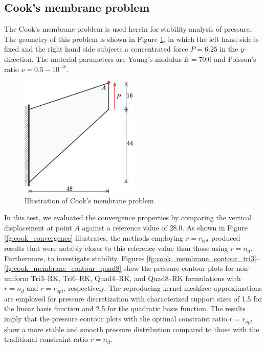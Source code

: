 \subsection{Cook's membrane problem}

The Cook's membrane problem \cite{simo1990} is used herein for stability analysis of pressure. The geometry of this problem is shown in Figure \ref{fg:cook_illsutration}, in which the left hand side is fixed and the right hand side subjects a concentrated force $P=6.25$ in the $y$-direction. The material parameters are Young's modulus $E=70.0$ and Poisson's ratio $\nu=0.5-10^{-8}$.

\begin{figure}[H]
\centering
\includegraphics[width=0.5\textwidth]{cook_membrane_model_r1.png}
\caption{Illustration of Cook's membrane problem}\label{fg:cook_illsutration}
\end{figure}

In this test, we evaluated the convergence properties by comparing the vertical displacement at point $A$ against a reference value of $28.0$. 
As shown in Figure \ref{fg:cook_convergence} illustrates, the methods employing $r=r_{opt}$ produced results that were notably closer to this reference value than those using $r=n_d$.
Furthermore, to investigate stability, Figures \ref{fg:cook_membrane_contour_tri3}--\ref{fg:cook_membrane_contour_quad8} show the pressure contour plots for non-uniform Tri3--RK, Tri6--RK, Quad4--RK, and Quad8--RK formulations with $r=n_d$ and $r=r_{opt}$, respectively.
The reproducing kernel meshfree approximations are employed for pressure discretization with characterized support sizes of 1.5 for the linear basis function and 2.5 for the quadratic basis function. The results imply that the pressure contour plots with the optimal constraint ratio $r=r_{opt}$ show a more stable and smooth pressure distribution compared to those with the traditional constraint ratio $r=n_d$.

